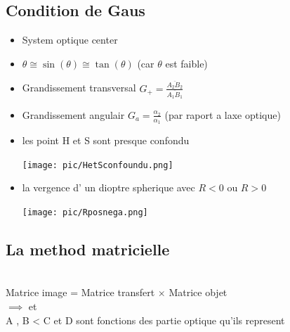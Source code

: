 \documentclass[12pt]{book}
\begin{document}
        \subsection{Condition de Gaus}
            \begin{itemize}
                \item  System optique center
                \item $\theta \cong \sin(\theta) \cong \tan(\theta)$ (car $\theta $ est faible)
                \item Grandissement transversal $G_+ = \frac{\overline{A_2B_2}}{\overline{A_1B_1}}$
                \item Grandissement angulair $G_a = \frac{\alpha_2}{\alpha_1}$ (par raport a laxe optique)\\
                    \begin{center}
                    \end{center}
                \item  les point H et S sont presque confondu \\ \begin{center}
                    \texttt{[image: pic/HetSconfoundu.png]}
                \end{center}
                \item la vergence d' un dioptre spherique  avec $R < 0 $ ou $ R >0$ 
                \begin{center}
                    \texttt{[image: pic/Rposnega.png]}
                \end{center}
            \end{itemize}
        \subsection{La method matricielle}
            \begin{center}
                 \\
                Matrice image = Matrice transfert $\times$ Matrice objet \\ 
                $ \implies$ et  \\
                A , B < C et D sont fonctions des partie optique qu'ils represent

            \end{center}
\end{document}
